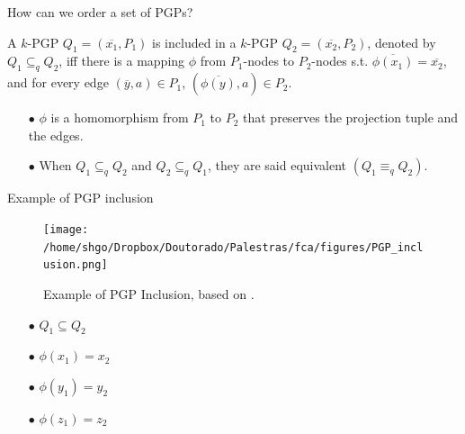 \documentclass[pdf,xcolor=table]{beamer}
\begin{document}
\begin{frame}[t]{How can we order a set of PGPs?}
    \begin{definition}
        A $k$-PGP $Q_1 = (\overline{x_1}, P_1)$ is included in a $k$-PGP $Q_2 = (\overline{x_2}, P_2)$, denoted by $Q_1 \subseteq_q Q_2$, iff there is a mapping $\phi$ from $P_1$-nodes to $P_2$-nodes s.t. $\overline{\phi(x_1)} = \overline{x_2}$, and for every edge $(\overline{y}, a) \in P_1$, $(\overline{\phi(y)}, a) \in P_2$.
    \end{definition}
    \begin{itemize}
        \item[$\bullet$] $\phi$ is a homomorphism from $P_1$ to $P_2$ that preserves the projection tuple and the edges.
        \item[$\bullet$] When $Q_1 \subseteq_q Q_2$ and $Q_2 \subseteq_q Q_1$, they are said equivalent $(Q_1 \equiv_q Q_2)$.
    \end{itemize}
\end{frame}

\begin{frame}[t]{Example of PGP inclusion}
    \begin{figure}[h]
        \texttt{[image: /home/shgo/Dropbox/Doutorado/Palestras/fca/figures/PGP\_inclusion.png]}
        \caption{Example of PGP Inclusion, based on \cite{Ferre2016}.}
    \end{figure}
    \begin{itemize}
        \item[$\bullet$] $Q_1 \subseteq Q_2$
        \item[$\bullet$] $\phi(x_1) = x_2$
        \item[$\bullet$] $\phi(y_1) = y_2$
        \item[$\bullet$] $\phi(z_1) = z_2$
    \end{itemize}
\end{frame}
\end{document}
